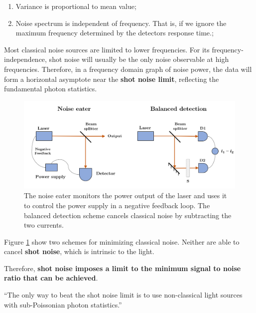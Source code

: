\documentclass[12pt,a4paper]{report}
\begin{document}
\begin{enumerate}
    \item Variance is proportional to mean value;
    \item Noise spectrum is independent of frequency. That is, if we ignore the maximum frequency determined by the detectors response time.;
\end{enumerate}


Most classical noise sources are limited to lower frequencies. For its frequency-independence, shot noise will usually be the only noise observable at high frequencies. Therefore, in a frequency domain graph of noise power, the data will form a horizontal asymptote near the \textbf{shot noise limit}, reflecting the fundamental photon statistics.

\begin{figure}[H]
    \centering
    \includegraphics[width=1.0\linewidth]{balanced detection and noise eater.png}
    \caption{The noise eater monitors the power output of the laser and uses it to control the power supply in a negative feedback loop. The balanced detection scheme cancels classical noise by subtracting the two currents.}
    \label{noise.eater.and.balanced.detection}
\end{figure}


Figure \ref{noise.eater.and.balanced.detection} show two schemes for minimizing classical noise. Neither are able to cancel \textbf{shot noise}, which is intrinsic to the light.

Therefore, \textbf{shot noise imposes a limit to the minimum signal to noise ratio that can be achieved}.

\begin{displayquote}
    ``The only way to beat the shot noise limit is to use non-classical light sources with sub-Poissonian photon statistics.''
\end{displayquote}
\end{document}
